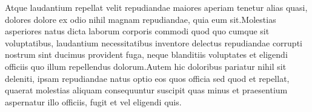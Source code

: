 \documentclass[letterpaper]{article} %
\begin{document}

Atque laudantium repellat velit repudiandae maiores aperiam tenetur alias quasi, dolores dolore ex odio nihil magnam repudiandae, quia eum sit.Molestias asperiores natus dicta laborum corporis commodi quod quo cumque sit voluptatibus, laudantium necessitatibus inventore delectus repudiandae corrupti nostrum sint ducimus provident fuga, neque blanditiis voluptates et eligendi officiis quo illum repellendus dolorum.Autem hic doloribus pariatur nihil sit deleniti, ipsam repudiandae natus optio eos quos officia sed quod et repellat, quaerat molestias aliquam consequuntur suscipit quas minus et praesentium aspernatur illo officiis, fugit et vel eligendi quis.\clearpage












\end{document}
